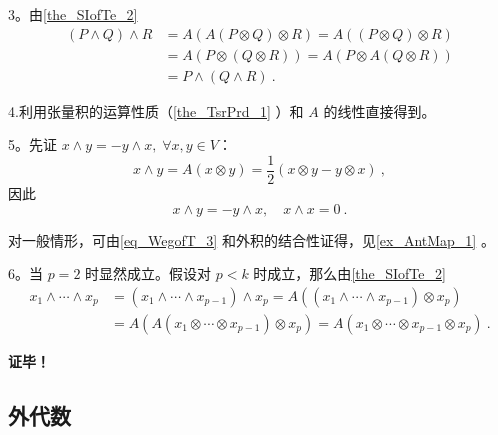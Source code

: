 3。由\autoref{the_SIofTe_2} 
\begin{equation}
\begin{aligned}
(P\wedge Q)\wedge R&=A(A(P\otimes Q)\otimes R)=A((P\otimes Q)\otimes R)\\
&=A(P\otimes (Q\otimes R))=A(P\otimes A(Q\otimes R))\\
&=P\wedge (Q\wedge R)~.
\end{aligned}
\end{equation}

4.利用张量积的运算性质（\autoref{the_TsrPrd_1}  ）和 $A$ 的线性直接得到。

5。先证 $x\wedge y=-y\wedge x,\;\forall x,y\in V$：
\begin{equation}
x\wedge y=A(x\otimes y)=\frac{1}{2}(x\otimes y-y\otimes x)~,
\end{equation}
因此
\begin{equation}\label{eq_WegofT_3}
x\wedge y=-y\wedge x,\quad x\wedge x=0~.
\end{equation}

对一般情形，可由\autoref{eq_WegofT_3} 和外积的结合性证得，见\autoref{ex_AntMap_1}  。

6。当 $p=2$ 时显然成立。假设对 $p<k$ 时成立，那么由\autoref{the_SIofTe_2} 
\begin{equation}
\begin{aligned}
x_1\wedge\cdots\wedge x_p&=(x_1\wedge\cdots\wedge x_{p-1})\wedge x_p=A((x_1\wedge\cdots\wedge x_{p-1})\otimes x_p)\\
&=A(A(x_1\otimes\cdots\otimes x_{p-1})\otimes x_p)=A(x_1\otimes\cdots\otimes x_{p-1}\otimes x_p)~.
\end{aligned}
\end{equation}

\textbf{证毕！}

\subsection{外代数}

